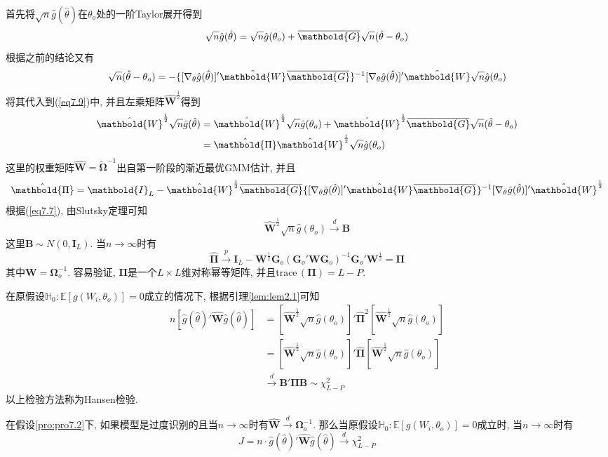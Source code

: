 \documentclass[cn, 12pt, math=mtpro2, bibstyle=apa, blue, twocol]{elegantbook}
\newcommand{\E}{\mathbb{E}}
\newcommand{\W}{\mathbold{W}}
\newcommand{\HH}{\mathbb{H}}
\newcommand{\BO}{\mathbold{\Omega}}
\newcommand{\G}{\mathbold{G}}
\newcommand{\overbar}[1]{\mkern 1.5mu\overline{\mkern-1.5mu#1\mkern-1.5mu}\mkern 1.5mu}
\begin{document}
首先将$\sqrt{n}\hat{g}(\hat{\theta})$在$\theta_o$处的一阶Taylor展开得到
\begin{equation}\label{eq7.9}
  \sqrt{n}\hat{g}(\hat{\theta})=\sqrt{n}\hat{g}(\theta_o)+\overbar{\G}\sqrt{n}(\hat{\theta}-\theta_o)
\end{equation}
根据之前的结论又有
$$\sqrt{n}(\hat{\theta}-\theta_o)=-\{[\nabla_\theta \hat{g}(\hat{\theta})]'\hat{\W}\overbar{\mathbold{G}}\}^{-1}[\nabla_\theta \hat{g}(\hat{\theta})]'\hat{\W}\sqrt{n}\hat{g}(\theta_o)$$
将其代入到(\ref{eq7.9})中, 并且左乘矩阵$\hat{\W}^{\frac{1}{2}}$得到
\begin{align*}
\hat{\W}^{\frac{1}{2}}\sqrt{n}\hat{g}(\hat{\theta})&=\hat{\W}^{\frac{1}{2}}\sqrt{n}\hat{g}(\theta_o)+\hat{\W}^{\frac{1}{2}}\overbar{\G}\sqrt{n}(\hat{\theta}-\theta_o) \\
&=\hat{\mathbold{\Pi}}\hat{\W}^{\frac{1}{2}}\sqrt{n}\hat{g}(\theta_o)
\end{align*}
这里的权重矩阵$\hat{\W}=\tilde{\BO}^{-1}$出自第一阶段的渐近最优GMM估计, 并且
$$\hat{\mathbold{\Pi}}=\mathbold{I}_L-\hat{\W}^{\frac{1}{2}}\overbar{\G}\{[\nabla_\theta \hat{g}(\hat{\theta})]'\hat{\W}\overbar{\G}\}^{-1}[\nabla_\theta\hat{g}(\hat{\theta})]'\hat{\W}^{\frac{1}{2}}$$
根据(\ref{eq7.7}), 由Slutsky定理可知
$$\hat{\W}^{\frac{1}{2}}\sqrt{n}\hat{g}(\theta_o)\xrightarrow{d} \mathbold{B}$$
这里$\mathbold{B}\sim N(0,\mathbold{I}_L)$. 当$n\to\infty$时有
$$\hat{\mathbold{\Pi}}\xrightarrow{p}\mathbold{I}_L-\W^{\frac{1}{2}}\G_o(\G_o'\W\G_o)^{-1}\G_o'\W^{\frac{1}{2}}=\mathbold{\Pi}$$
其中$\W=\BO_o^{-1}$. 容易验证, $\mathbold{\Pi}$是一个$L\times L$维对称幂等矩阵, 并且$\text{trace}\,(\mathbold{\Pi})=L-P$.

在原假设$\HH_0: \E[g(W_i,\theta_o)]=0$成立的情况下, 根据引理\ref{lem:lem2.1}可知
\begin{align*}
n[\hat{g}(\hat{\theta})'\hat{\W}\hat{g}(\hat{\theta})]&=[\hat{\W}^{\frac{1}{2}}\sqrt{n}\hat{g}(\theta_o)]'\hat{\mathbold{\Pi}}^2[\hat{\W}^{\frac{1}{2}}\sqrt{n}\hat{g}(\theta_o)] \\
&=[\hat{\W}^{\frac{1}{2}}\sqrt{n}\hat{g}(\theta_o)]'\hat{\mathbold{\Pi}}[\hat{\W}^{\frac{1}{2}}\sqrt{n}\hat{g}(\theta_o)] \\
&\xrightarrow{d} \mathbold{B}'\mathbold{\Pi B}\sim \chi^2_{L-P}
\end{align*}
以上检验方法称为Hansen检验.
\begin{theorem}\label{thm:thm7.5}
  在假设\ref{pro:pro7.2}下, 如果模型是过度识别的且当$n\to\infty$时有$\hat{\W}\xrightarrow{d}\BO_o^{-1}$. 那么当原假设$\HH_0:\E[g(W_i,\theta_o)]=0$成立时, 当$n\to\infty$时有
  $$J=n\cdot \hat{g}(\hat{\theta})'\hat{\W}\hat{g}(\hat{\theta}) \xrightarrow{d}\chi_{L-P}^2$$
\end{theorem}
\end{document}
